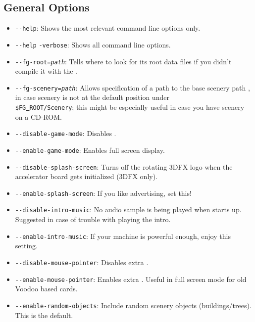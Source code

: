 \subsection{General Options}\label{generaloptions}
\begin{itemize}
\item{\texttt{-$ $-help}}: Shows the most relevant command line options only.
\item{\texttt{-$ $-help} \texttt{-verbose}}: Shows all command line options.
\item{\texttt{-$ $-fg-root={\it path}}}: Tells \FlightGear{} where to look for its root data
  files if you didn't compile it with the .
\item{\texttt{-$ $-fg-scenery={\it path}}}: Allows specification of a path to the base scenery path , in case scenery is not at the default position under\\
 \texttt{\$FG\underline{~}ROOT/Scenery}; this might be especially useful in case you
have scenery on a CD-ROM.
\item{\texttt{-$ $-disable-game-mode}}: Disables .
\item{\texttt{-$ $-enable-game-mode}}: Enables full screen display.
\item{\texttt{-$ $-disable-splash-screen}}: Turns off the rotating 3DFX logo
 when the accelerator board gets initialized (3DFX only).
\item{\texttt{-$ $-enable-splash-screen}}: If you like advertising, set this!
\item{\texttt{-$ $-disable-intro-music}}: No audio sample is being played when
  \FlightGear{} starts up. Suggested in case of trouble with playing the intro.
\item{\texttt{-$ $-enable-intro-music}}: If your machine is powerful enough, enjoy
  this setting.
\item{\texttt{-$ $-disable-mouse-pointer}}: Disables extra .
\item{\texttt{-$ $-enable-mouse-pointer}}: Enables extra . Useful in
full screen mode for old Voodoo based cards.
\item{\texttt{-$ $-enable-random-objects}}: Include random scenery objects (buildings/trees). This is the default.

\end{itemize}
